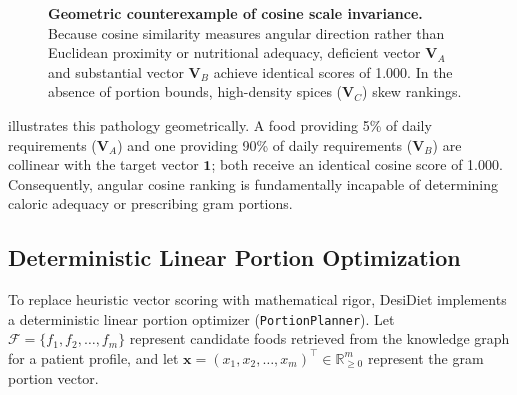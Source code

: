 \documentclass[5p,times,twocolumn]{elsarticle}
\makeatletter
\def\systemname{DesiDiet}%
\def\my@bx{bx}
\def\my@b{b}
\DeclareRobustCommand{\systemname}{%
  \texorpdfstring{%
    \ifx\f@series\my@bx
      DesiDiet%
    \else\ifx\f@series\my@b
      DesiDiet%
    \else
      \textsc{DesiDiet}%
    \fi\fi
  }{DesiDiet}%
}
\makeatother
\begin{document}
\begin{figure}[!htbp]
{
  }
  \caption{\textbf{Geometric counterexample of cosine scale invariance.} Because cosine similarity measures angular direction rather than Euclidean proximity or nutritional adequacy, deficient vector $\mathbf{V}_A$ and substantial vector $\mathbf{V}_B$ achieve identical scores of 1.000. In the absence of portion bounds, high-density spices ($\mathbf{V}_C$) skew rankings.}
  \label{fig:cosine_counterexample}
\end{figure}

 illustrates this pathology geometrically. A food providing 5\% of daily requirements ($\mathbf{V}_A$) and one providing 90\% of daily requirements ($\mathbf{V}_B$) are collinear with the target vector $\mathbf{1}$; both receive an identical cosine score of 1.000. Consequently, angular cosine ranking is fundamentally incapable of determining caloric adequacy or prescribing gram portions.

\subsection{Deterministic Linear Portion Optimization}
To replace heuristic vector scoring with mathematical rigor, \systemname{} implements a deterministic linear portion optimizer (\texttt{PortionPlanner}). Let $\mathcal{F} = \{f_1, f_2, \ldots, f_m\}$ represent candidate foods retrieved from the knowledge graph for a patient profile, and let $\mathbf{x} = (x_1, x_2, \ldots, x_m)^\top \in \mathbb{R}_{\ge 0}^m$ represent the gram portion vector.
\end{document}
